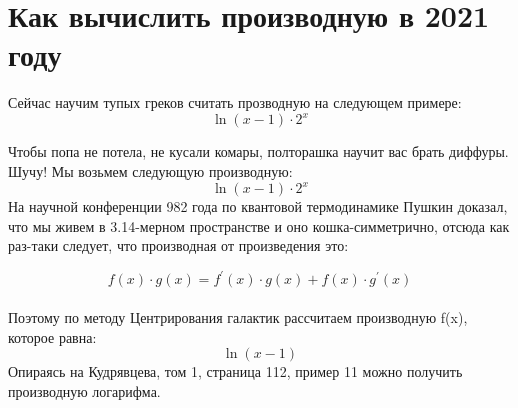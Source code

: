 \documentclass[a4paper,12pt]{article}
\begin{document}
\section{Как вычислить производную в 2021 году}

Сейчас научим тупых греков считать прозводную на следующем примере:
\begin{equation}
\ln(x-1)  \cdot 2^{x} 
\end{equation} 

Чтобы попа не потела, не кусали комары, полторашка научит вас брать диффуры. Шучу! Мы возьмем следующую производную:
\begin{equation}
\ln(x-1)  \cdot 2^{x} 
\end{equation} 
На научной конференции 982 года по квантовой термодинамике Пушкин доказал, что мы живем в 3.14-мерном пространстве и оно кошка-симметрично, отсюда как раз-таки следует, что производная от произведения это:

  \begin{equation}
  f(x) \cdot g(x) = f^{'}(x) \cdot g(x) + f(x) \cdot g^{'}(x)
 \end{equation} \\Поэтому по методу Центрирования галактик рассчитаем производную f(x), которое равна: 
\begin{equation}
\ln(x-1) 
\end{equation} 
Опираясь на Кудрявцева, том 1, страница 112, пример 11 можно получить производную логарифма.
\end{document}

